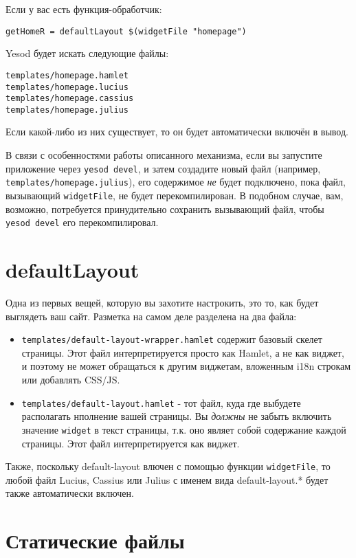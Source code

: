 Если у вас есть функция-обработчик:
\begin{lstlisting}
getHomeR = defaultLayout $(widgetFile "homepage")
\end{lstlisting}%
Yesod будет искать следующие файлы:
\begin{lstlisting}
templates/homepage.hamlet
templates/homepage.lucius
templates/homepage.cassius
templates/homepage.julius
\end{lstlisting}

Если какой-либо из них существует, то он будет автоматически включён в вывод.

\begin{remark}
В связи с особенностями работы описанного механизма, если вы запустите приложение
через \texttt{yesod devel}, и затем создадите новый файл (например,
\texttt{templates/homepage.julius}), его содержимое \emph{не} будет подключено,
пока файл, вызывающий \lstinline!widgetFile!, не будет перекомпилирован.  В
подобном случае, вам, возможно, потребуется принудительно сохранить вызывающий файл,
чтобы \texttt{yesod devel} его перекомпилировал.
\end{remark}

\section{defaultLayout}

Одна из первых вещей, которую вы захотите настрокить, это то, как будет выглядеть ваш сайт.
Разметка на самом деле разделена на два файла:
\begin{itemize}
  \item \lstinline!templates/default-layout-wrapper.hamlet! содержит базовый скелет
    страницы. Этот файл интерпретируется просто как Hamlet, а не как виджет, и поэтому
    не может обращаться к другим виджетам, вложенным i18n строкам или добавлять CSS/JS.
  \item \lstinline!templates/default-layout.hamlet! - тот файл, куда где выбудете располагать
    нполнение вашей страницы. Вы \emph{должны} не забыть включить значение \lstinline!widget!
    в текст страницы, т.к. оно являет собой содержание каждой страницы. Этот файл
    интерпретируется как виджет.
\end{itemize}

Также, поскольку default-layout влючен с помощью функции \lstinline!widgetFile!, то любой
файл Lucius, Cassius или Julius с именем вида default-layout.* будет также автоматически включен.

\section{Статические файлы}

